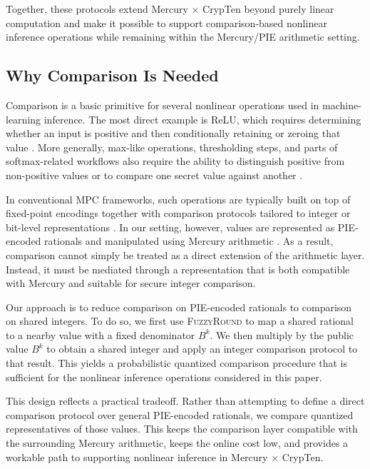 Together, these protocols extend Mercury $\times$ CrypTen beyond purely
linear computation and make it possible to support comparison-based
nonlinear inference operations while remaining within the Mercury/PIE
arithmetic setting.

\subsection{Why Comparison Is Needed}
\label{sec:why-comparison}

Comparison is a basic primitive for several nonlinear operations used in
machine-learning inference. The most direct example is ReLU, which
requires determining whether an input is positive and then conditionally
retaining or zeroing that value \cite{crypten-paper}. %
More generally, max-like operations, thresholding steps, and parts of
softmax-related workflows also require the ability to distinguish
positive from non-positive values or to compare one secret value against
another \cite{crypten-paper,ppml-inference-survey}. %

In conventional MPC frameworks, such operations are typically built on
top of fixed-point encodings together with comparison protocols tailored
to integer or bit-level representations \cite{fixed-point-mpc,acco-paper}. %
In our setting, however, values are represented as PIE-encoded rationals
and manipulated using Mercury arithmetic \cite{mercury-paper}. %
As a result, comparison cannot simply be treated as a direct extension
of the arithmetic layer. Instead, it must be mediated through a
representation that is both compatible with Mercury and suitable for
secure integer comparison.

Our approach is to reduce comparison on PIE-encoded rationals to comparison on shared integers. 
To do so, we first use \textsc{FuzzyRound} to map a shared rational to a nearby value with a fixed denominator $B^k$. 
We then multiply by the public value $B^k$ to obtain a shared integer and apply an integer comparison protocol to that result. 
This yields a probabilistic quantized comparison procedure that is sufficient for the nonlinear inference operations considered in this paper.

This design reflects a practical tradeoff. Rather than attempting to define a direct comparison protocol over general PIE-encoded rationals, we compare quantized representatives of those values. 
This keeps the comparison layer compatible with the surrounding Mercury arithmetic, keeps the online cost low, and provides a workable path to supporting nonlinear inference in Mercury $\times$ CrypTen.

